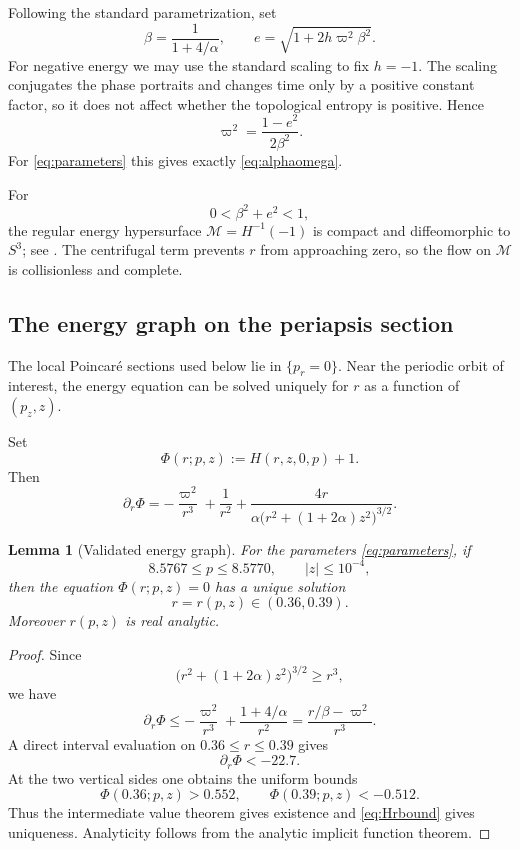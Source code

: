 \documentclass[11pt]{article}
\newtheorem{lemma}[theorem]{Lemma}
\newcommand{\cM}{\mathcal M}
\newcommand{\pr}{p_r}
\newcommand{\pz}{p_z}
\begin{document}
Following the standard parametrization, set
\begin{equation}\label{eq:betae}
 \beta=\frac{1}{1+4/\alpha},
 \qquad
 e=\sqrt{1+2h\varpi^2\beta^2}.
\end{equation}
For negative energy we may use the standard scaling to fix $h=-1$.
The scaling conjugates the phase portraits and changes time only by a
positive constant factor, so it does not affect whether the topological
entropy is positive.  Hence
\[
 \varpi^2=\frac{1-e^2}{2\beta^2}.
\]
For \eqref{eq:parameters} this gives exactly \eqref{eq:alphaomega}.

For
\[
 0<\beta^2+e^2<1,
\]
the regular energy hypersurface $\cM=H^{-1}(-1)$ is compact and
diffeomorphic to $S^3$; see \cite{Moeckel1984,HuLiuOuSalomaoYu}.
The centrifugal term prevents $r$ from approaching zero, so the flow on
$\cM$ is collisionless and complete.

\subsection{The energy graph on the periapsis section}

The local Poincar\'e sections used below lie in $\{\pr=0\}$.  Near the
periodic orbit of interest, the energy equation can be solved uniquely for
$r$ as a function of $(\pz,z)$.

Set
\[
 \Phi(r;p,z):=H(r,z,0,p)+1.
\]
Then
\begin{equation}\label{eq:Phi_r}
 \partial_r\Phi
 =
 -\frac{\varpi^2}{r^3}
 +\frac{1}{r^2}
 +\frac{4r}
 {\alpha\bigl(r^2+(1+2\alpha)z^2\bigr)^{3/2}}.
\end{equation}

\begin{lemma}[Validated energy graph]\label{lem:energygraph}
For the parameters \eqref{eq:parameters}, if
\[
 8.5767\le p\le8.5770,\qquad |z|\le10^{-4},
\]
then the equation $\Phi(r;p,z)=0$ has a unique solution
\[
 r=r(p,z)\in(0.36,0.39).
\]
Moreover $r(p,z)$ is real analytic.
\end{lemma}

\begin{proof}
Since
\[
 \bigl(r^2+(1+2\alpha)z^2\bigr)^{3/2}\ge r^3,
\]
we have
\[
 \partial_r\Phi
 \le
 -\frac{\varpi^2}{r^3}
 +\frac{1+4/\alpha}{r^2}
 =
 \frac{r/\beta-\varpi^2}{r^3}.
\]
A direct interval evaluation on $0.36\le r\le0.39$ gives
\begin{equation}\label{eq:Hrbound}
 \partial_r\Phi<-22.7.
\end{equation}
At the two vertical sides one obtains the uniform bounds
\begin{equation}\label{eq:PhiSides}
 \Phi(0.36;p,z)>0.552,
 \qquad
 \Phi(0.39;p,z)<-0.512.
\end{equation}
Thus the intermediate value theorem gives existence and
\eqref{eq:Hrbound} gives uniqueness.  Analyticity follows from the analytic
implicit function theorem.
\end{proof}
\end{document}
